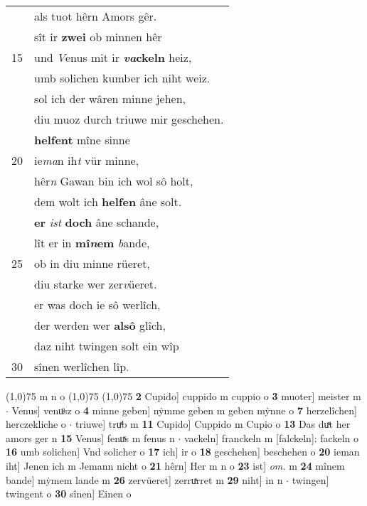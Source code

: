 \documentclass[8pt,a4paper,notitlepage]{article}
\begin{document}
\begin{table}[ht]
\begin{minipage}[t]{0.5\linewidth}
\begin{tabular}{rl}
 & als tuot hêrn Amors gêr.\\ 
 & sît ir \textbf{zwei} ob minnen hêr\\ 
15 & und \textit{V}enus mit ir \textbf{\textit{va}ckeln} heiz,\\ 
 & umb solichen kumber ich niht weiz.\\ 
 & sol ich der wâren minne jehen,\\ 
 & diu muoz durch triuwe mir geschehen.\\ 
 & \textbf{helfent} mîne sinne\\ 
20 & ie\textit{ma}n ih\textit{t} vür minne,\\ 
 & hêr\textit{n} Gawan bin ich wol sô holt,\\ 
 & dem wolt ich \textbf{helfen} âne solt.\\ 
 & \textbf{er} \textit{ist} \textbf{doch} âne schande,\\ 
 & lît er in \textbf{mî\textit{n}em} \textit{b}ande,\\ 
25 & ob in diu minne rüeret,\\ 
 & diu starke wer zer\textit{v}üeret.\\ 
 & er was doch ie sô werlîch,\\ 
 & der werden wer \textbf{alsô} glîch,\\ 
 & daz niht twingen solt ein wîp\\ 
30 & sînen werlîchen lîp.\\ 
\end{tabular}
\scriptsize
\line(1,0){75} \newline
m n o \newline
\line(1,0){75} \newline
\newline
\line(1,0){75} \newline
\textbf{2} Cupido] cuppido m cuppio o \textbf{3} muoter] meister m  $\cdot$ Venus] venuͦsz o \textbf{4} minne geben] nẏmme geben m geben mẏnne o \textbf{7} herzelîchen] herczekliche o  $\cdot$ triuwe] truͯb m \textbf{11} Cupido] Cuppido m Cupio o \textbf{13} Das duͯt her amors ger n \textbf{15} Venus] fenuͯs m fenus n  $\cdot$ vackeln] franckeln m [falckeln]: fackeln o \textbf{16} umb solichen] Vnd solicher o \textbf{17} ich] ir o \textbf{18} geschehen] beschehen o \textbf{20} ieman iht] Jenen ich m Jemann nicht o \textbf{21} hêrn] Her m n o \textbf{23} ist] \textit{om.} m \textbf{24} mînem bande] mẏmem lande m \textbf{26} zervüeret] zerruͯrret m \textbf{29} niht] in n  $\cdot$ twingen] twingent o \textbf{30} sînen] Einen o \newline
\end{minipage}
\end{table}
\end{document}
